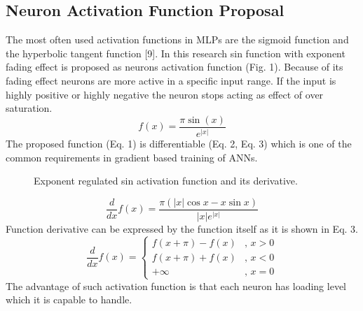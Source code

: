 \documentclass{llncs}
\begin{document}
\subsection{Neuron Activation Function Proposal}
%
The most often used activation functions in MLPs are the sigmoid function and the hyperbolic tangent function [9]. In this research sin function with exponent fading effect is proposed as neurons activation function (Fig. 1). Because of its fading effect neurons are more active in a specific input range. If the input is highly positive or highly negative the neuron stops acting as effect of over saturation.
%
\begin{equation}
f(x) = \frac {\pi \sin(x)} { e^{ |x| }}
\end{equation}
%
The proposed function (Eq. 1) is differentiable (Eq. 2, Eq. 3) which is one of the common requirements in gradient based training of ANNs.
%
\begin{figure}
    \centering
    \caption{Exponent regulated sin activation function and its derivative.}
    \label{fig:fig01}
\end{figure}
%
\begin{equation}
\frac{d}{dx}f(x) = \frac {\pi (|x|\cos x - x\sin x)} { |x| e^{ |x| } }
\end{equation}
%
Function derivative can be expressed by the function itself as it is shown in Eq. 3.
%
\begin{equation}
\frac{d}{dx}f(x) = 
\left\{
	\begin{array}{ll}
		f(x + \pi) - f(x) & \mbox{, } x > 0 \\
		f(x + \pi) + f(x) & \mbox{, } x < 0 \\
		+\infty & \mbox{, } x = 0
	\end{array}
\right.
\end{equation}
%
The advantage of such activation function is that each neuron has loading level which it is capable to handle. 
\end{document}
